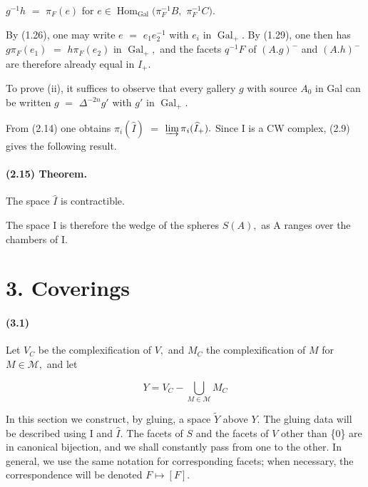 \documentclass[10pt,a4paper]{article}
\begin{document}
\ensuremath{g^{-1}h} \ensuremath{=} \ensuremath{\pi{}_F(e)} for \ensuremath{e\in{}\operatorname{Hom}_{\operatorname{Gal}}(\pi{}_F^{-1}B,} \ensuremath{\pi{}_F^{-1}C).}\par

By (1.26), one may write \ensuremath{e} \ensuremath{=} \ensuremath{e_1e_2^{-1}} with \ensuremath{e_i} in \ensuremath{\operatorname{Gal}_+.} By (1.29), one then has \ensuremath{g\pi{}_F(e_1)} \ensuremath{=} \ensuremath{h\pi{}_F(e_2)} in \ensuremath{\operatorname{Gal}_+,} and the facets \ensuremath{q^{-1}F} of \ensuremath{(A.g)^{-}} and \ensuremath{(A.h)^{-}} are therefore already equal in \ensuremath{I_+.}\par

To prove (ii), it suffices to observe that every gallery \ensuremath{g} with source \ensuremath{A_0} in Gal can be written \ensuremath{g} \ensuremath{=} \ensuremath{\Delta{}^{-2n}g'} with \ensuremath{g'} in \ensuremath{\operatorname{Gal}_+.}\par

From (2.14) one obtains \ensuremath{\pi{}_i(\widehat{I})} \ensuremath{=} \ensuremath{\varinjlim\pi{}_i(\widehat{I}_+).} Since I is a CW complex, (2.9) gives the following result.\par

\paragraph{(2.15) Theorem.} The space \ensuremath{\widehat{I}} is contractible.

The space I is therefore the wedge of the spheres \ensuremath{S(A),} as A ranges over the chambers of I.\par

\section*{3. Coverings}

\paragraph{(3.1)} Let \ensuremath{V_C} be the complexification of \ensuremath{V,} and \ensuremath{M_C} the complexification of \ensuremath{M} for \ensuremath{M\in{}\mathcal{M},} and let

\[
Y = V_C - \bigcup_{M\in{}\mathcal{M}} M_C
\]

In this section we construct, by gluing, a space \ensuremath{\widetilde{Y}} above \ensuremath{Y.} The gluing data will be described using I and \ensuremath{\widehat{I}.} The facets of \ensuremath{S} and the facets of \ensuremath{V} other than \{0\} are in canonical bijection, and we shall constantly pass from one to the other. In general, we use the same notation for corresponding facets; when necessary, the correspondence will be denoted \ensuremath{F\longmapsto{}[F].}\par
\end{document}
